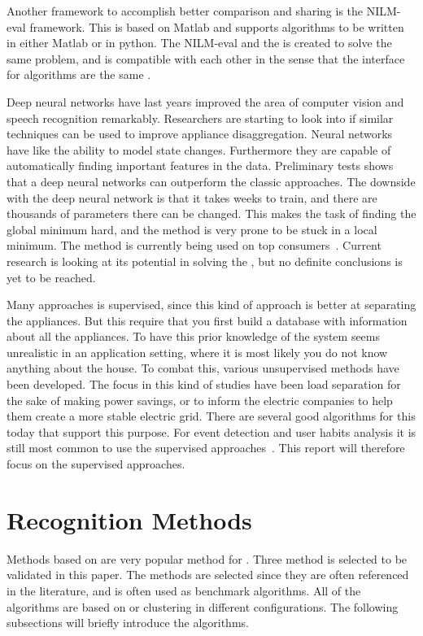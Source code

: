 Another framework to accomplish better comparison and sharing is the NILM-eval framework. This is based on Matlab and supports algorithms to be written in either Matlab or in python. The NILM-eval and the  is created to solve the same problem, and is compatible with each other in the sense that the interface for algorithms are the same \citep{RefWorks:26}. 

Deep neural networks have last years improved the area of computer vision and speech recognition remarkably. Researchers are starting to look into if similar techniques can be used to improve appliance disaggregation. Neural networks have like  the ability to model state changes. Furthermore they are capable of automatically finding important features in the data. Preliminary tests shows that a deep neural networks can outperform the classic  approaches. The downside with the deep neural network is that it takes weeks to train, and there are thousands of parameters there can be changed. This makes the task of finding the global minimum hard, and the method is very prone to be stuck in a local minimum. The method is currently being used on top consumers~\citep{RefWorks:25}. Current research is looking at its potential in solving the , but no definite conclusions is yet to be reached. 

Many approaches is supervised, since this kind of approach is better at separating the appliances. But this require that you first build a database with information about all the appliances. To have this prior knowledge of the system seems unrealistic in an application setting, where it is most likely you do not know anything about the house. To combat this, various unsupervised methods have been developed. The focus in this kind of studies have been load separation for the sake of making power savings, or to inform the electric companies to help them create a more stable electric grid. There are several good algorithms for this today that support this purpose. For event detection and user habits analysis it is still most common to use the supervised approaches~\citep{RefWorks:19}. This report will therefore focus on the supervised approaches. 

\newpage
			

\section{Recognition Methods}
\label{RecognitionMethods}
Methods based on  are very popular method for . Three method is selected to be validated in this paper. The methods are selected since they are often referenced in the literature, and is often used as benchmark algorithms. All of the algorithms are based on  or clustering in different configurations. The following subsections will briefly introduce the algorithms. 

